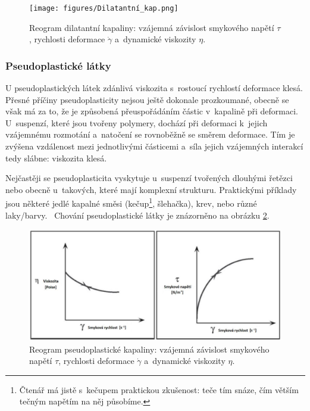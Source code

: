 \documentclass[12pt]{article}
\begin{document}
\begin{figure}
    \centering
    \texttt{[image: figures/Dilatantní\_kap.png]}
    \caption{Reogram dilatantní kapaliny: vzájemná závislost smykového napětí $\tau$, rychlosti deformace $\dot\gamma$ a~dynamické viskozity $\eta$.~\cite{thesis:Viskozimetr_pro_viskozni_materialy}}
    \label{fig:dilatantní_kap}
\end{figure}

\subsubsection{Pseudoplastické látky}%

U pseudoplastických látek zdánlivá viskozita s~rostoucí rychlostí deformace klesá. Přesné příčiny pseudoplasticity nejsou ještě dokonale prozkoumané, obecně se však má za to, že je způsobená přeuspořádáním částic v~kapalině při deformaci. U~suspenzí, které jsou tvořeny polymery, dochází při deformaci k~jejich vzájemnému rozmotání a~natočení se rovnoběžně se směrem deformace. Tím je zvýšena vzdálenost mezi jednotlivými částicemi a~síla jejich vzájemných interakcí tedy slábne: viskozita klesá.~\cite{wiki:Shear_thinning}
\label{sec:pseudoplasticita}
\par
Nejčastěji se pseudoplasticita vyskytuje u~suspenzí tvořených dlouhými řetězci nebo obecně u~takových, které mají komplexní strukturu. Praktickými příklady jsou některé jedlé kapalné směsi (kečup\footnote{Čtenář má jistě s~kečupem praktickou zkušenost: teče tím snáze, čím větším tečným napětím na něj působíme.}, šlehačka), krev, nebo různé laky/barvy.~\cite{wiki:Shear_thinning} Chování pseudoplastické látky je znázorněno na obrázku \ref{fig:pseudoplast_kap}.

\begin{figure}
    \centering
    \includegraphics[width=\linewidth]{figures/Pseudoplast_kap.png}
    \caption{Reogram pseudoplastické kapaliny: vzájemná závislost smykového napětí $\tau$, rychlosti deformace $\dot\gamma$ a~dynamické viskozity $\eta$.~\cite{thesis:Viskozimetr_pro_viskozni_materialy}}
    \label{fig:pseudoplast_kap}
\end{figure}
\end{document}
